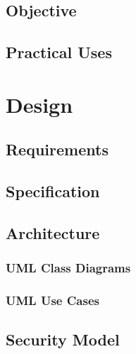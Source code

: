 \documentclass[a4paper,12pt]{report}
\begin{document}
\section{Objective}



\section{Practical Uses}




\chapter{Design}

\section{Requirements}



\section{Specification}



\section{Architecture}



\subsection{UML Class Diagrams}





\subsection{UML Use Cases}



\section{Security Model}


\end{document}
